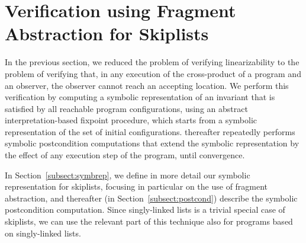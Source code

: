 \section{Verification using Fragment Abstraction for Skiplists}
\label{sec:fragment-abstraction}
In the previous section, we reduced the problem of verifying linearizability
to the problem of verifying
that, in any execution of the cross-product of a program and an observer, 
the observer cannot reach an accepting location.
We perform this verification by  computing a symbolic representation
of an invariant that is satisfied by all reachable program configurations,
using an abstract interpretation-based fixpoint procedure, which starts
from a symbolic representation of the set of initial configurations.
thereafter repeatedly performs
symbolic postcondition computations that extend the
symbolic representation by the effect of any execution step of the program,
until convergence.

In Section~\ref{subsect:symbrep}, we
define in more detail our symbolic representation for skiplists,
focusing in particular on the use of fragment abstraction, and thereafter
(in Section~\ref{subsect:postcond})
describe the symbolic postcondition computation.
Since singly-linked lists is a trivial special case of skiplists, we can use
the relevant part of this technique also for programs based on singly-linked
lists.




